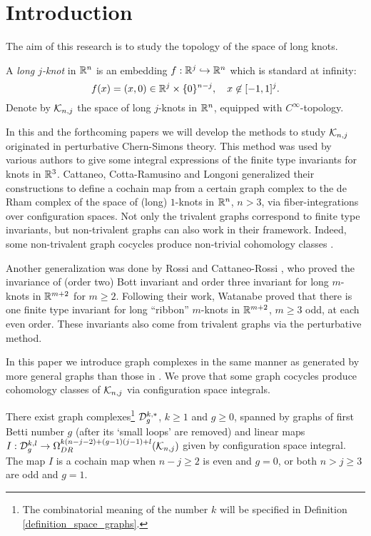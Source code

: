 \section{Introduction}\label{sec_intro}


The aim of this research is to study the topology of the space of long knots.


\begin{defn}\label{def_knotspace}
A {\em long $j$-knot} in $\mathbb{R}^n$ is an embedding $f: \mathbb{R}^j \hookrightarrow \mathbb{R}^n$ which is standard at infinity:
\[
 f(x) = (x,0) \in \mathbb{R}^j \times \{ 0 \}^{n-j} , \quad x \not\in [-1,1]^j .
\]
Denote by $\mathcal{K}_{n ,j}$ the space of long $j$-knots in $\mathbb{R}^n$, equipped with $C^{\infty}$-topology.
\end{defn}


In this and the forthcoming papers \cite{KWatanabe08} we will develop the methods to study $\mathcal{K}_{n ,j}$ originated in
perturbative Chern-Simons theory.
This method was used by various authors \cite{AltschulerFreidel97, BottTaubes94, Kohno94} to give some integral
expressions of the finite type invariants for knots in $\mathbb{R}^3$.
Cattaneo, Cotta-Ramusino and Longoni \cite{CCL02} generalized their constructions to define a cochain map from a
certain graph complex to the de Rham complex of the space of (long) $1$-knots in $\mathbb{R}^n$, $n>3$, via fiber-integrations
over configuration spaces.
Not only the trivalent graphs correspond to finite type invariants, but non-trivalent graphs can also work in their
framework.
Indeed, some non-trivalent graph cocycles produce non-trivial cohomology classes \cite{Longoni04, K07}.


Another generalization was done by Rossi \cite{Rossi_thesis} and Cattaneo-Rossi \cite{CattaneoRossi05}, who proved the
invariance of (order two) Bott invariant and order three invariant for long $m$-knots in $\mathbb{R}^{m+2}$ for $m \ge 2$.
Following their work, Watanabe \cite{Watanabe07} proved that there is one finite type invariant for long ``ribbon''
$m$-knots \cite{HabiroKanenobuShima99} in $\mathbb{R}^{m+2}$, $m \ge 3$ odd, at each even order.
These invariants also come from trivalent graphs via the perturbative method.


In this paper we introduce graph complexes in the same manner as \cite{CCL02} generated by more general graphs
than those in \cite{CattaneoRossi05, Rossi_thesis, Watanabe07}.
We prove that some graph cocycles produce cohomology classes of $\mathcal{K}_{n ,j}$ via configuration space integrals.


\begin{thm}\label{thm_main2}
There exist graph complexes\footnote
{
The combinatorial meaning of the number $k$ will be specified in Definition \ref{definition_space_graphs}.
}
 $\mathcal{D}^{k,*}_g$, $k \ge 1$ and $g\ge 0$, spanned by graphs of first Betti number $g$ (after its
`small loops' are removed) and linear maps $I : \mathcal{D}^{k,l}_g \to \Omega^{k(n-j-2)+(g-1)(j-1)+l}_{DR}(\mathcal{K}_{n ,j})$ given by
configuration space integral.
The map $I$ is a cochain map when $n-j \ge 2$ is even and $g=0$, or both $n>j\ge 3$ are odd and $g=1$.
\end{thm}


